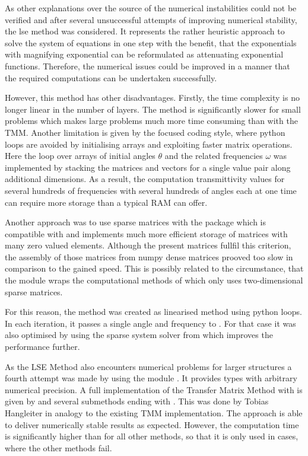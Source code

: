 As other explanations over the source of the numerical instabilities could not
be verified and after several unsuccessful attempts of improving numerical
stability, the lse method was considered. It represents the rather heuristic
approach to solve the system of equations in one step with the benefit, that
the exponentials with magnifying exponential can be reformulated as attenuating
exponential functions. Therefore, the numerical issues could be improved in a
manner that the required computations can be undertaken successfully.

However, this method has other disadvantages. Firstly, the time complexity is
no longer linear in the number of layers. %
The method is significantly slower for small problems which makes large
problems much more time consuming than with the TMM.
Another limitation is given by
the  focused coding style, where python loops are avoided by
initialising arrays and exploiting faster matrix operations. Here the loop over
arrays of initial angles $\theta$ and the related frequencies $\omega$ was
implemented by stacking the matrices and vectors for a single value pair along
additional dimensions. As a result, the computation transmittivity values for
several hundreds of frequencies with several hundreds of angles each at one
time can require more storage than a typical RAM can offer.

Another approach was to use sparse matrices
with the package  which is compatible with  and
implements much more efficient storage of matrices with many zero valued
elements. Although the present matrices fullfil this criterion, the assembly of
those matrices from numpy dense matrices prooved too slow in comparison to the
gained speed. This is possibly related to the circumstance, that the module
wraps the computational methods of  which only uses
two-dimensional sparse matrices.

For this reason, the method  was created as linearised
method using python loops. In each iteration, it passes a single angle and
frequency to . For that case it was also optimised by using
the sparse system solver  from  which
improves the performance further.

As the LSE Method also encounters numerical problems for larger structures a
fourth attempt was made by using the module . It provides
types with arbitrary numerical precision. A full implementation of the Transfer
Matrix Method with  is given by  and
several submethods ending with . This was done by Tobias Hangleiter in
analogy to the existing TMM implementation.
The  approach is able to deliver numerically stable results as
expected. However, the computation time is significantly higher than for all
other methods, so that it is only used in cases, where the other methods fail.

